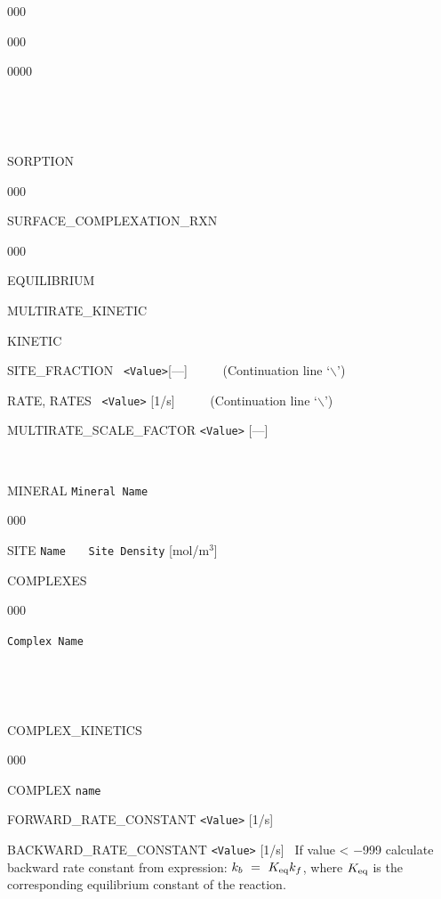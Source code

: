 \documentclass[12pt]{article}
\begin{document}
\begin{deflist}{000}
\begin{deflist}{000}
\begin{deflist}{0000}
~\\

\item [\keyend]
\end{deflist}
\item [\keyend] ~

~\\

\item[SORPTION] ~

\begin{deflist}{000}
\item[SURFACE\_COMPLEXATION\_RXN] ~

\begin{deflist}{000}
\item[EQUILIBRIUM]

\item[MULTIRATE\_KINETIC]

\item[KINETIC]


\item [SITE\_FRACTION] \ {\tt <Value>}[---] \ \ \ \ \ (Continuation line `$\backslash$')
\item [RATE, RATES] \ {\tt <Value>} [1/s] \ \ \ \ \ (Continuation line `$\backslash$')
\item [MULTIRATE\_SCALE\_FACTOR] {\tt <Value>} [---]

~\\

\item [MINERAL] {\tt Mineral Name}
\begin{deflist}{000}
\item[SITE] {\tt Name} \ \ \ {\tt Site Density} [mol/m$^3$]
\item[COMPLEXES] ~
\begin{deflist}{000}
\item[\tt Complex Name]
\end{deflist}
\item [\keyend] ~

~\\

\item[COMPLEX\_KINETICS] ~
\begin{deflist}{000}
\item[COMPLEX] {\tt name}
\item[FORWARD\_RATE\_CONSTANT] {\tt <Value>} [1/s]
\item[BACKWARD\_RATE\_CONSTANT] {\tt <Value>} [1/s] \ If value < $-$999 calculate backward rate constant from expression: $k_b \ =\  K_{\rm eq} k_f$, where $K_{\rm eq}$ is the corresponding equilibrium constant of the reaction.
\end{deflist}
\item [\keyend] ~
\end{deflist}
\item [\keyend] ~


\end{deflist}
\end{deflist}
\end{deflist}
\end{deflist}
\end{document}
